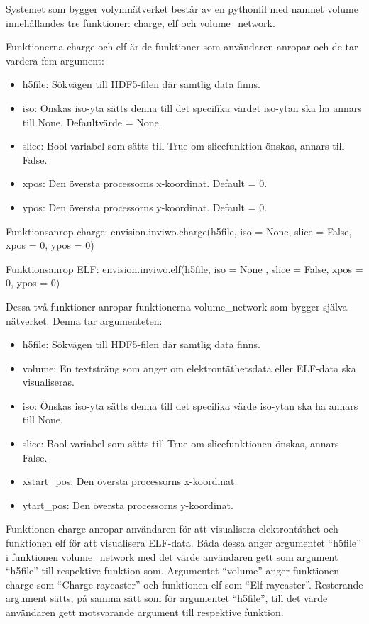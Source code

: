 \documentclass[a4paper,12pt]{article}
\begin{document}
Systemet som bygger volymnätverket består av en pythonfil med namnet volume
innehållandes tre funktioner: charge, elf och volume\_network.

Funktionerna charge och elf är de funktioner som användaren anropar och de tar vardera fem argument:

\begin{itemize}
\item h5file: Sökvägen till HDF5-filen där samtlig data finns.
\item iso: Önskas iso-yta
sätts denna till det specifika värdet iso-ytan ska ha annars till None. Defaultvärde = None.
\item slice: Bool-variabel som sätts till True om slicefunktion önskas, annars till False.
\item xpos: Den översta processorns x-koordinat. Default = 0.
\item ypos: Den översta processorns y-koordinat. Default = 0.
\end{itemize}

Funktionsanrop charge: \newline
envision.inviwo.charge(h5file, iso = None,
slice = False, xpos = 0, ypos = 0)

Funktionsanrop ELF: \newline
envision.inviwo.elf(h5file, iso = None
, slice = False, xpos = 0, ypos = 0) \newline

Dessa två funktioner anropar funktionerna volume\_network som bygger själva nätverket. Denna tar argumenteten:

\begin{itemize}
\item h5file: Sökvägen till HDF5-filen där samtlig data finns.
\item volume: En textsträng som anger om elektrontäthetsdata eller ELF-data ska visualiseras.
\item iso: Önskas iso-yta sätts denna till det specifika värde iso-ytan ska ha annars till None.
\item slice: Bool-variabel som sätts till True om slicefunktionen önskas, annars False.
\item xstart\_pos: Den översta processorns x-koordinat.
\item ytart\_pos: Den översta processorns y-koordinat.
\end{itemize}

Funktionen charge anropar användaren för att visualisera elektrontäthet och funktionen elf för att visualisera ELF-data. Båda dessa anger argumentet ``h5file” i funktionen volume\_network 
med det värde användaren gett som argument 
``h5file” till respektive funktion som. Argumentet ``volume” anger funktionen charge som ``Charge raycaster” och funktionen elf som ``Elf raycaster”. 
Resterande argument sätts, på samma sätt som för argumentet ``h5file”, till det värde användaren gett motsvarande argument till respektive funktion.
\end{document}
